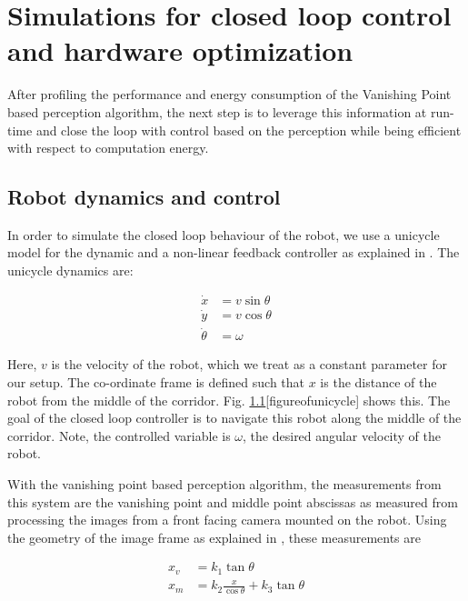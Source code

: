\section{Simulations for closed loop control and hardware optimization}

After profiling the performance and energy consumption of the Vanishing Point based perception algorithm, the next step is to leverage this information at run-time and close the loop with control based on the perception while being efficient with respect to computation energy.

\subsection{Robot dynamics and control}

In order to simulate the closed loop behaviour of the robot, we use a unicycle model for the dynamic and a non-linear feedback controller as explained in \cite{VP2}. The unicycle dynamics are:

\begin{subequations}
\begin{align}
\dot{x} &= v\sin\theta \nonumber \\
\dot{y} &= v\cos\theta \nonumber \\
\dot{\theta} &= \omega 
\end{align}
\label{eq:plant}
\end{subequations}

Here, $v$ is the velocity of the robot, which we treat as a constant parameter for our setup. The co-ordinate frame is defined such that $x$ is the distance of the robot from the middle of the corridor. Fig. \ref{}[figureofunicycle] shows this. The goal of the closed loop controller is to navigate this robot along the middle of the corridor. Note, the controlled variable is $\omega$, the desired angular velocity of the robot.

With the vanishing point based perception algorithm, the measurements from this system are the vanishing point and middle point abscissas as measured from processing the images from a front facing camera mounted on the robot. Using the geometry of the image frame as explained in \cite{VP2}, these measurements are

\begin{subequations}
\begin{align}
x_v &= k_1\tan\theta \nonumber \\
x_m &= k_2\frac{x}{\cos\theta} + k_3\tan\theta
\end{align}
\label{eq:measurements}
\end{subequations}

